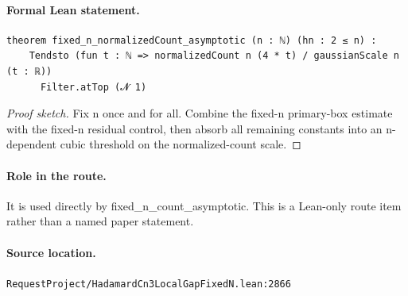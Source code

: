 \medskip
\paragraph{Formal Lean statement.}
\begin{verbatim}
theorem fixed_n_normalizedCount_asymptotic (n : ℕ) (hn : 2 ≤ n) :
    Tendsto (fun t : ℕ => normalizedCount n (4 * t) / gaussianScale n (t : ℝ))
      Filter.atTop (𝓝 1)
\end{verbatim}
\begin{proof}[Proof sketch]
Fix n once and for all. Combine the fixed-n primary-box estimate with the fixed-n residual control, then absorb all remaining constants into an n-dependent cubic threshold on the normalized-count scale.
\end{proof}
\paragraph{Role in the route.}
It is used directly by fixed\_n\_count\_asymptotic. This is a Lean-only route item rather than a named paper statement.
\paragraph{Source location.}
\texttt{RequestProject/HadamardCn3LocalGapFixedN.lean:2866}
\medskip
